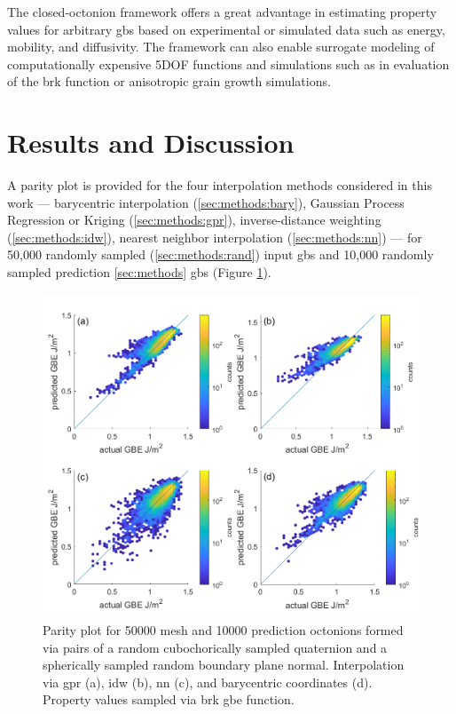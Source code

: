 \documentclass[preprint,12pt]{elsarticle}
\begin{document}
The closed-octonion framework offers a great advantage in estimating property values for arbitrary \glspl{gb} based on experimental or simulated data such as energy, mobility, and diffusivity. The framework can also enable surrogate modeling of computationally expensive 5DOF functions and simulations such as in evaluation of the \gls{brk} function or anisotropic grain growth simulations.

\section{Results and Discussion} \label{sec:resultsDiscussion}

A parity plot is provided for the four interpolation methods considered in this work --- barycentric interpolation (\ref{sec:methods:bary}), Gaussian Process Regression or Kriging (\ref{sec:methods:gpr}), inverse-distance weighting (\ref{sec:methods:idw}), nearest neighbor interpolation (\ref{sec:methods:nn}) --- for 50,000 randomly sampled (\ref{sec:methods:rand}) input \glspl{gb} and 10,000 randomly sampled prediction \ref{sec:methods} \glspl{gb} (Figure \ref{fig:brk-parity50000}).

\begin{figure}
    \centering
    \includegraphics{brkparity50000.png}
    \caption{Parity plot for 50000 mesh and 10000 prediction octonions formed via pairs of a random cubochorically sampled quaternion and a spherically sampled random boundary plane normal. Interpolation via \acrlong{gpr} (a), \acrlong{idw} (b), \acrlong{nn} (c), and barycentric coordinates (d). Property values sampled via \acrlong{brk} \acrlong{gbe} function.}
    \label{fig:brk-parity50000}
\end{figure}
\end{document}
